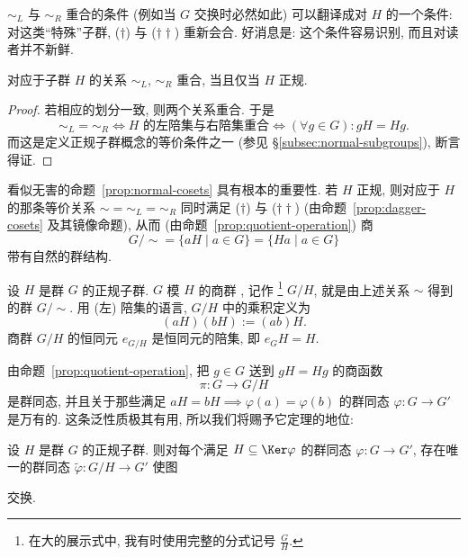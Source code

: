$\sim_L$ 与 $\sim_R$ 重合的条件 (例如当 $G$ 交换时必然如此) 可以翻译成对 $H$ 的一个条件: 对这类``特殊''子群, ($\dagger$) 与 ($\dagger\dagger$) 重新会合. 好消息是: 这个条件容易识别, 而且对读者并不新鲜.

\begin{proposition}
\label{prop:normal-cosets}
对应于子群 $H$ 的关系 $\sim_L$, $\sim_R$ 重合, 当且仅当 $H$ 正规.
\end{proposition}

\begin{proof}
若相应的划分一致, 则两个关系重合. 于是
\[
{\sim_L} = {\sim_R} \iff H \text{ 的左陪集与右陪集重合} \iff (\forall g \in G): gH = Hg.
\]
而这是定义正规子群概念的等价条件之一 (参见 \S\ref{subsec:normal-subgroups}), 断言得证.
\end{proof}

看似无害的命题~\ref{prop:normal-cosets} 具有根本的重要性. 若 $H$ 正规, 则对应于 $H$ 的那条等价关系 $\sim = {\sim_L} = {\sim_R}$ 同时满足 ($\dagger$) 与 ($\dagger\dagger$) (由命题~\ref{prop:dagger-cosets} 及其镜像命题), 从而 (由命题~\ref{prop:quotient-operation}) 商
\[
G/{\sim} = \{aH \mid a \in G\} = \{Ha \mid a \in G\}
\]
带有自然的群结构.

\begin{definition}
\label{def:quotient-group}
设 $H$ 是群 $G$ 的正规子群. $G$ 模 $H$ 的商群%
, 记作%
\footnote{在大的展示式中, 我有时使用完整的分式记号 $\frac{G}{H}$.}%
$G/H$, 就是由上述关系 $\sim$ 得到的群 $G/{\sim}$. 用 (左) 陪集的语言, $G/H$ 中的乘积定义为
\[
(aH)(bH) := (ab)H.
\]
商群 $G/H$ 的恒同元 $e_{G/H}$ 是恒同元的陪集, 即 $e_G H = H$.
\end{definition}

由命题~\ref{prop:quotient-operation}, 把 $g \in G$ 送到 $gH = Hg$ 的商函数
\[
\pi : G \to G/H
\]
是群同态, 并且关于那些满足 $aH = bH \implies \varphi(a) = \varphi(b)$ 的群同态 $\varphi : G \to G'$ 是万有的. 这条泛性质极其有用, 所以我们将赐予它定理的地位:

\begin{theorem}
\label{thm:quotient-universal}
设 $H$ 是群 $G$ 的正规子群. 则对每个满足 $H \subseteq \Ker \varphi$ 的群同态 $\varphi : G \to G'$, 存在唯一的群同态 $\tilde{\varphi} : G/H \to G'$ 使图
\begin{center}
\end{center}
交换.
\end{theorem}

